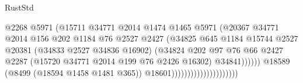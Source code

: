 \begin{lexlean}{RustStd}
\begin{coremodule}
                                                  @2268
                                                  @5971
                                                  (@15711
                                                    @34771
                                                    @2014
                                                    @1474
                                                    @1465
                                                    @5971
                                                    (@20367
                                                      @34771
                                                      @2014
                                                      @156
                                                      @202
                                                      @1184
                                                      @76
                                                      @2527
                                                      @2427
                                                      (@34825
                                                        @645
                                                        @1184
                                                        @15744
                                                        @2527
                                                        @20381
                                                        (@34833 @2527 @34836 @16902)
                                                        (@34824
                                                          @202
                                                          @97
                                                          @76
                                                          @66
                                                          @2427
                                                          @2287
                                                          (@15720
                                                            @34771
                                                            @2014
                                                            @199
                                                            @76
                                                            @2426
                                                            @16302)
                                                          @34841))))))
                                              @18589
                                              (@8499 (@18594 @1458 @1481 @365))
                                              @18601)))))))))))))))))))))

\end{coremodule}
\end{lexlean}
